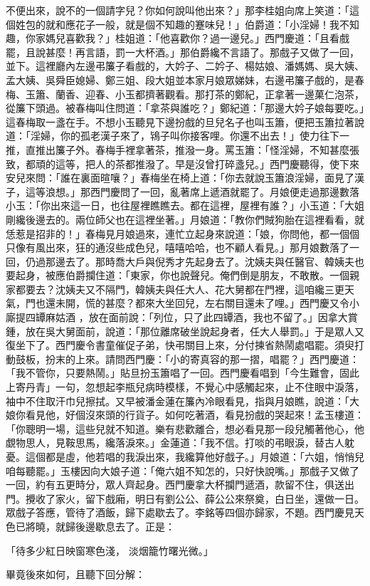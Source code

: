 不便出來，說不的一個請字兒？你如何說叫他出來？」那李桂姐向席上笑道：「這個姓包的就和應花子一般，就是個不知趣的蹇味兒！」伯爵道：「小淫婦！我不知趣，你家媽兒喜歡我？」桂姐道：「他喜歡你？過一邊兒。」西門慶道：「且看戲罷，且說甚麼！再言語，罰一大杯酒。」那伯爵纔不言語了。那戲子又做了一回，並下。這裡廳內左邊弔簾子看戲的，大妗子、二妗子、楊姑娘、潘媽媽、吳大姨、孟大姨、吳舜臣媳婦、鄭三姐、段大姐並本家月娘眾娣妹，右邊弔簾子戲的，是春梅、玉簫、蘭香、迎春、小玉都擠著觀看。那打茶的鄭紀，正拿著一邊菓仁泡茶，從簾下頭過。被春梅叫住問道：「拿茶與誰吃？」鄭紀道：「那邊大妗子娘每要吃。」這春梅取一盞在手。不想小玉聽見下邊扮戲的旦兒名子也叫玉簫，便把玉簫拉著說道：「淫婦，你的孤老漢子來了，鴇子叫你接客哩。你還不出去！」使力往下一推，直推出簾子外。春梅手裡拿著茶，推潑一身。罵玉簫：「怪淫婦，不知甚麼張致，都頑的這等，把人的茶都推潑了。早是沒曾打碎盞兒。」西門慶聽得，使下來安兒來問：「誰在裏面暄嚷？」春梅坐在椅上道：「你去就說玉簫浪淫婦，面見了漢子，這等浪想。」那西門慶問了一回，亂著席上遞酒就罷了。月娘便走過那邊數落小玉：「你出來這一日，也往屋裡瞧瞧去。都在這裡，屋裡有誰？」小玉道：「大姐剛纔後邊去的。兩位師父也在這裡坐著。」月娘道：「教你們賊狗胎在這裡看看，就恁惹是招非的！」春梅見月娘過來，連忙立起身來說道：「娘，你問他，都一個個只像有風出來，狂的通沒些成色兒，嘻嘻哈哈，也不顧人看見。」那月娘數落了一回，仍過那邊去了。那時喬大戶與倪秀才先起身去了。沈姨夫與任醫官、韓姨夫也要起身，被應伯爵攔住道：「東家，你也說聲兒。俺們倒是朋友，不敢散。一個親家都要去？沈姨夫又不隔門，韓姨夫與任大人、花大舅都在門裡，這咱纔三更天氣，門也還未開，慌的甚麼？都來大坐回兒，左右關目還未了哩。」西門慶又令小廝提四罈麻姑酒 ，放在面前說：「列位，只了此四罈酒，我也不留了。」因拿大賞鍾，放在吳大舅面前，說道：「那位離席破坐說起身者，任大人舉罰。」于是眾人又復坐下了。西門慶令書童催促子弟，快弔關目上來，分付揀省熱鬧處唱罷。須臾打動鼓板，扮末的上來。請問西門慶：「小的寄真容的那一摺，唱罷？」西門慶道：「我不管你，只要熱鬧。」貼旦扮玉簫唱了一回。西門慶看唱到「今生難會，固此上寄丹青」一句，忽想起李瓶兒病時模樣，不覺心中感觸起來，止不住眼中淚落，袖中不住取汗巾兒擦拭。又早被潘金蓮在簾內冷眼看見，指與月娘瞧，說道：「大娘你看見他，好個沒來頭的行貨子。如何吃著酒，看見扮戲的哭起來！孟玉樓道：「你聰明一場，這些兒就不知道。樂有悲歡離合，想必看見那一段兒觸著他心，他覷物思人，見鞍思馬，纔落淚來。」金蓮道：「我不信。打啖的弔眼淚，替古人躭憂。這個都是虛，他若唱的我淚出來，我纔算他好戲子。」月娘道：「六姐，悄悄兒咱每聽罷。」玉樓因向大娘子道：「俺六姐不知怎的，只好快說嘴。」那戲子又做了一回，約有五更時分，眾人齊起身。西門慶拿大杯攔門遞酒，款留不住，俱送出門。攪收了家火，留下戲廂，明日有劉公公、薛公公來祭奠，白日坐，還做一日。眾戲子答應，管待了酒飯，歸下處歇去了。李銘等四個亦歸家，不題。西門慶見天色已將曉，就歸後邊歇息去了。正是：

「待多少紅日映窗寒色淺，  淡烟籠竹曙光微。」

畢竟後來如何，且聽下回分解：